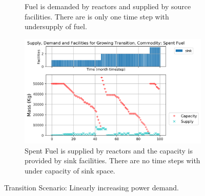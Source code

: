 \begin{figure}[]
\begin{subfigure}[t]{0.65\textwidth}
        \caption{Fuel is demanded by reactors and supplied by source facilities.
        There are is only one time step with undersupply of fuel.}
	    \label{fig:growingtransition-fuel}
    \end{subfigure}
    \begin{subfigure}[t]{0.65\textwidth}
        \centering
        \includegraphics[width=\linewidth]{figures/growingtransition-spentfuel.png} 
        \caption{Spent Fuel is supplied by reactors and the capacity is provided by sink facilities.
        There are no time steps with under capacity of sink space.}
        \label{fig:growingtransition-spentfuel}
    \end{subfigure}
    \caption{Transition Scenario: Linearly increasing power demand.}
\end{figure}
